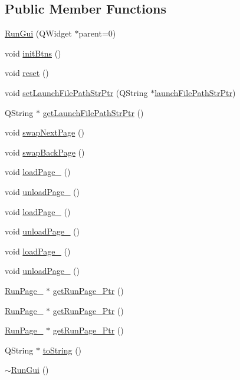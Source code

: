 \subsection*{Public Member Functions}
\begin{DoxyCompactItemize}
\item 
\hyperlink{class_run_gui_af41e6138b6401d18ff8a3f8db680cd43}{Run\-Gui} (Q\-Widget $\ast$parent=0)
\item 
void \hyperlink{class_run_gui_ad78d722a104e6e893b57642340c3b937}{init\-Btns} ()
\item 
void \hyperlink{class_run_gui_ac732d44ad96c7d14f1666d1193c43d65}{reset} ()
\item 
void \hyperlink{class_run_gui_a8b202a47e593e0aa6d18d33c6c857308}{set\-Launch\-File\-Path\-Str\-Ptr} (Q\-String $\ast$\hyperlink{class_run_gui_a3766ac7d4bfae38eb0d9f535f0d9bcf5}{launch\-File\-Path\-Str\-Ptr})
\item 
Q\-String $\ast$ \hyperlink{class_run_gui_a2dd3619058d2cb92433d4f000bf97851}{get\-Launch\-File\-Path\-Str\-Ptr} ()
\item 
void \hyperlink{class_run_gui_ac4c0fed5ead22a1dc40d5bebe2d6f176}{swap\-Next\-Page} ()
\item 
void \hyperlink{class_run_gui_a469be74273ddc6441a9f87e65d3ab2c9}{swap\-Back\-Page} ()
\item 
void \hyperlink{class_run_gui_a381d265f46ec8473a7858974a19674c5}{load\-Page\-\_} ()
\item 
void \hyperlink{class_run_gui_ab68852933855016b114c795ab494d8bb}{unload\-Page\-\_} ()
\item 
void \hyperlink{class_run_gui_a8048ffff4b07771419e8c88ea250d2f2}{load\-Page\-\_} ()
\item 
void \hyperlink{class_run_gui_a3192d643a700244e066f3e0ca4389c4b}{unload\-Page\-\_} ()
\item 
void \hyperlink{class_run_gui_a5defb3e688b1b3f22d50c5b9389910c0}{load\-Page\-\_} ()
\item 
void \hyperlink{class_run_gui_a410e373ff032fb779b52b1dd501c3128}{unload\-Page\-\_} ()
\item 
\hyperlink{class_run_page__1}{Run\-Page\-\_} $\ast$ \hyperlink{class_run_gui_a95cc37ac9578c247ef63a48dba41d4ac}{get\-Run\-Page\-\_\-Ptr} ()
\item 
\hyperlink{class_run_page__2}{Run\-Page\-\_} $\ast$ \hyperlink{class_run_gui_a06c9594c92feb7de3240a06234fbcb1f}{get\-Run\-Page\-\_\-Ptr} ()
\item 
\hyperlink{class_run_page__3}{Run\-Page\-\_} $\ast$ \hyperlink{class_run_gui_aa1aaf93bef6ab33cd6a48cc49c7f0583}{get\-Run\-Page\-\_\-Ptr} ()
\item 
Q\-String $\ast$ \hyperlink{class_run_gui_a4a3470c32bf986ad552bc225d039e5bb}{to\-String} ()
\item 
\hyperlink{class_run_gui_a22945ade9579f8d0e44f848c51a0a0b0}{$\sim$\-Run\-Gui} ()
\end{DoxyCompactItemize}
